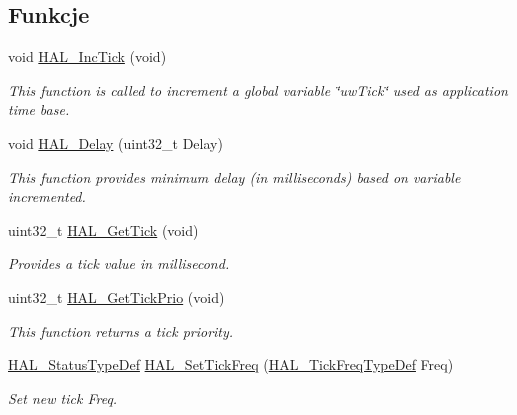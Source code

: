 \subsection*{Funkcje}
\begin{DoxyCompactItemize}
\item 
void \hyperlink{group___h_a_l___exported___functions___group2_gaba5b726bfedd013bf7bb5a51d5c4f188}{H\+A\+L\+\_\+\+Inc\+Tick} (void)
\begin{DoxyCompactList}\small\item\em This function is called to increment a global variable \char`\"{}uw\+Tick\char`\"{} used as application time base. \end{DoxyCompactList}\item 
void \hyperlink{group___h_a_l___exported___functions___group2_gab1dc1e6b438daacfe38a312a90221330}{H\+A\+L\+\_\+\+Delay} (uint32\+\_\+t Delay)
\begin{DoxyCompactList}\small\item\em This function provides minimum delay (in milliseconds) based on variable incremented. \end{DoxyCompactList}\item 
uint32\+\_\+t \hyperlink{group___h_a_l___exported___functions___group2_gac9b3a85a73735ac840d0dcb59bc0fdd6}{H\+A\+L\+\_\+\+Get\+Tick} (void)
\begin{DoxyCompactList}\small\item\em Provides a tick value in millisecond. \end{DoxyCompactList}\item 
uint32\+\_\+t \hyperlink{group___h_a_l___exported___functions___group2_gacdcc8b5d33b9f97fe1b0abd6a86a3d4b}{H\+A\+L\+\_\+\+Get\+Tick\+Prio} (void)
\begin{DoxyCompactList}\small\item\em This function returns a tick priority. \end{DoxyCompactList}\item 
\hyperlink{stm32f4xx__hal__def_8h_a63c0679d1cb8b8c684fbb0632743478f}{H\+A\+L\+\_\+\+Status\+Type\+Def} \hyperlink{group___h_a_l___exported___functions___group2_ga47f2dd240b2aed823a76b11496f37690}{H\+A\+L\+\_\+\+Set\+Tick\+Freq} (\hyperlink{group___h_a_l___t_i_c_k___f_r_e_q_gab36ec81674817249c46734772ff3b73a}{H\+A\+L\+\_\+\+Tick\+Freq\+Type\+Def} Freq)
\begin{DoxyCompactList}\small\item\em Set new tick Freq. \end{DoxyCompactList}\item 

\end{DoxyCompactItemize}
